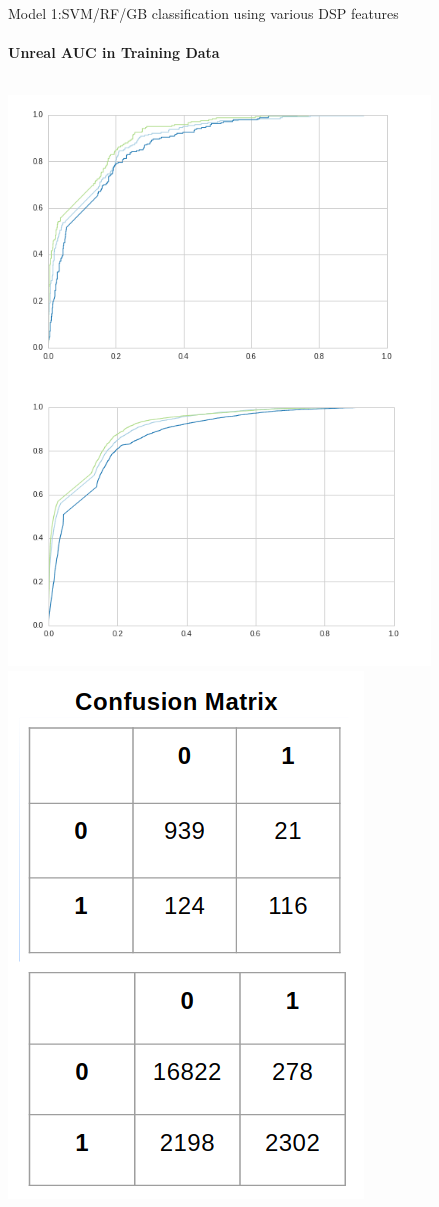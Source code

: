 \documentclass{beamer}
\begin{document}
\begin{frame}{Model 1:SVM/RF/GB classification using various DSP features}
  \framesubtitle{Unreal AUC in Training Data}

  \begin{columns}
    \includegraphics[scale=0.25]{img/roccurve.png}
    \includegraphics[scale=0.25]{img/confmatrix.png}

\end{columns}
\end{frame}
\end{document}
